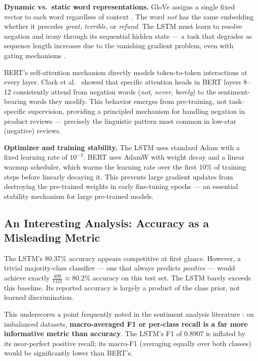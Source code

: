 \documentclass[11pt, a4paper]{article}
\begin{document}
\textbf{Dynamic vs.\ static word representations.} GloVe assigns a single fixed vector to each word regardless of context \cite{pennington2014glove}. The word \textit{not} has the same embedding whether it precedes \textit{great}, \textit{terrible}, or \textit{refund}. The LSTM must learn to resolve negation and irony through its sequential hidden state --- a task that degrades as sequence length increases due to the vanishing gradient problem, even with gating mechanisms \cite{hochreiter1997lstm}.

BERT's self-attention mechanism directly models token-to-token interactions at every layer. Clark et al.\ \cite{clark2019what} showed that specific attention heads in BERT layers 8--12 consistently attend from negation words (\textit{not}, \textit{never}, \textit{barely}) to the sentiment-bearing words they modify. This behavior emerges from pre-training, not task-specific supervision, providing a principled mechanism for handling negation in product reviews --- precisely the linguistic pattern most common in low-star (negative) reviews.

\textbf{Optimizer and training stability.} The LSTM uses standard Adam with a fixed learning rate of $10^{-3}$. BERT uses AdamW \cite{loshchilov2017decoupled} with weight decay and a linear warmup scheduler, which warms the learning rate over the first 10\% of training steps before linearly decaying it. This prevents large gradient updates from destroying the pre-trained weights in early fine-tuning epochs --- an essential stability mechanism for large pre-trained models.

\subsection{An Interesting Analysis: Accuracy as a Misleading Metric}

The LSTM's 80.37\% accuracy appears competitive at first glance. However, a trivial majority-class classifier --- one that always predicts \textit{positive} --- would achieve exactly $\frac{899}{1121} \approx 80.2\%$ accuracy on this test set. The LSTM barely exceeds this baseline. Its reported accuracy is largely a product of the class prior, not learned discrimination.

This underscores a point frequently noted in the sentiment analysis literature \cite{zhang2018deep}: on imbalanced datasets, \textbf{macro-averaged F1 or per-class recall is a far more informative metric than accuracy}. The LSTM's F1 of 0.8907 is inflated by its near-perfect positive recall; its macro-F1 (averaging equally over both classes) would be significantly lower than BERT's.
\end{document}
